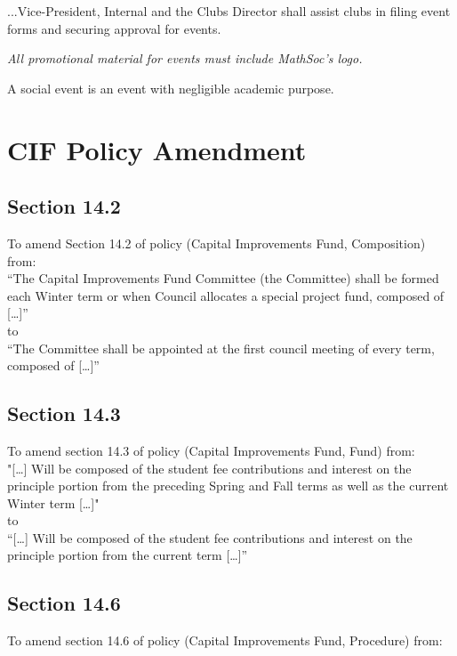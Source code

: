 \documentclass[12pt, letterpaper]{article}
\begin{document}
...Vice-President, Internal and the Clubs Director shall assist clubs in filing
event forms and securing approval for events.

\emph{All promotional material for events must include MathSoc's logo.}

A social event is an event with negligible academic purpose.


\newpage
{}


\newpage
{}




\newpage
{}
\section*{CIF Policy Amendment}

\subsection*{Section 14.2}
To amend Section 14.2 of policy (Capital Improvements Fund, Composition) from:\\

“The Capital Improvements Fund Committee (the Committee) shall be formed each Winter term or when Council allocates a special project fund, composed of […]”\\

to\\

“The Committee shall be appointed at the first council meeting of every term, composed of […]”

\subsection*{Section 14.3}
To amend section 14.3 of policy (Capital Improvements Fund, Fund) from:\\

"[…] Will be composed of the student fee contributions and interest on the principle portion from the preceding Spring and Fall terms as well as the current Winter term […]"\\

to\\

“[…] Will be composed of the student fee contributions and interest on the principle portion from the current term […]”

\subsection*{Section 14.6}
To amend section 14.6 of policy (Capital Improvements Fund, Procedure) from:\\
\end{document}
